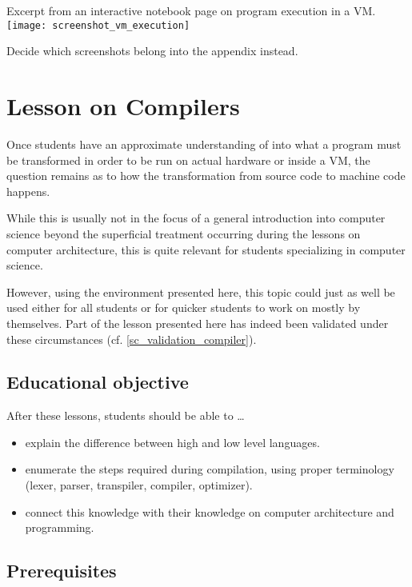 \begin{cfigure}{Excerpt from an interactive notebook page on program execution in a \ac{VM}.}
\texttt{[image: screenshot\_vm\_execution]}
\begin{todo}
\item Decide which screenshots belong into the appendix instead.
\end{todo}
\end{cfigure}



\section{Lesson on Compilers} \label{sc_lesson_compiler}

Once students have an approximate understanding of into what a program must be transformed in order to be run on actual hardware or inside a \ac{VM}, the question remains as to how the transformation from source code to machine code happens.

While this is usually not in the focus of a general introduction into computer science beyond the superficial treatment occurring during the lessons on computer architecture, this is quite relevant for students specializing in computer science.

However, using the environment presented here, this topic could just as well be used either for all students or for quicker students to work on mostly by themselves. Part of the lesson presented here has indeed been validated under these circumstances (cf. \ref{sc_validation_compiler}).


\subsection{Educational objective}

After these lessons, students should be able to \dots
\begin{itemize}
\item explain the difference between high and low level languages.
\item enumerate the steps required during compilation, using proper terminology (lexer, parser, transpiler, compiler, optimizer).
\item connect this knowledge with their knowledge on computer architecture and programming.
\end{itemize}


\subsection{Prerequisites}

